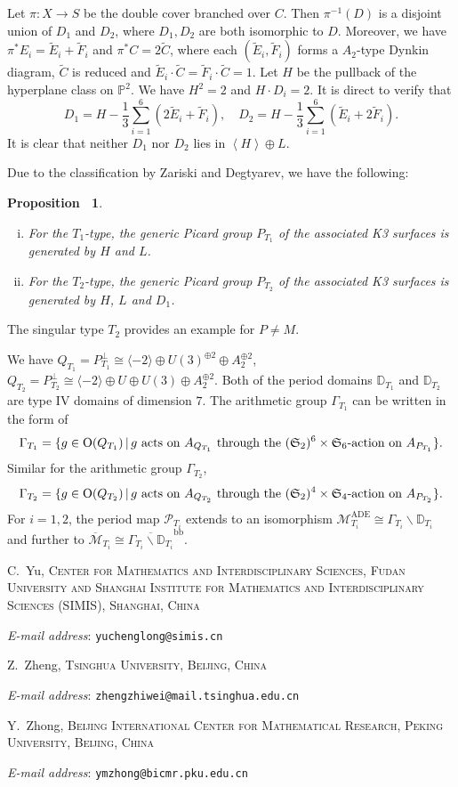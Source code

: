 \documentclass[12pt,reqno,a4paper]{amsart}
\makeatletter
\newtheorem{prop}[thm]{Proposition~}
\theoremstyle{remark}
\theoremstyle{definition}
\newcommand{\PP}{\mathbb{P}}
\newcommand{\DD}{\mathbb{D}}
\newcommand{\Prd}{\mathscr{P}}
\newcommand{\calM}{\mathcal{M}}
\newcommand\Or{\mathrm{O}}
\newcommand{\bs}{\backslash}
\newcommand{\Addresses}{{%
		\bigskip
		\footnotesize
		
		C.~Yu, \textsc{Center for Mathematics and Interdisciplinary Sciences, Fudan University and
Shanghai Institute for Mathematics and Interdisciplinary Sciences (SIMIS), Shanghai, China}\par\nopagebreak
		\textit{E-mail address}: \texttt{yuchenglong@simis.cn}
		
		\medskip
		
		Z.~Zheng, \textsc{Tsinghua University, Beijing, China}\par\nopagebreak
		\textit{E-mail address}: \texttt{zhengzhiwei@mail.tsinghua.edu.cn}

        \medskip
		
		Y.~Zhong, \textsc{Beijing International Center for Mathematical Research, Peking University, Beijing, China}\par\nopagebreak
		\textit{E-mail address}: \texttt{ymzhong@bicmr.pku.edu.cn}
}}
\makeatother
\begin{document}
Let $\pi\colon X\to S$ be the double cover branched over $C$.
Then $\pi^{-1}(D)$ is a disjoint union of $D_1$ and $D_2$, where $D_1,D_2$ are both isomorphic to $D$.
Moreover, we have $\pi^* E_i = \widetilde{E}_i + \widetilde{F}_i$ and $\pi^* C = 2 \widetilde{C}$, where each $(\widetilde{E}_i,\widetilde{F}_i)$ forms a $A_2$-type Dynkin diagram, $\widetilde{C}$ is reduced and $\widetilde{E}_i\cdot \widetilde{C} = \widetilde{F}_i\cdot \widetilde{C} = 1$.
Let $H$ be the pullback of the hyperplane class on $\PP^2$.
We have $H^2=2$ and $H\cdot D_i=2$.
It is direct to verify that 
\begin{equation*}
    D_1 = H - \frac{1}{3}\sum_{i=1}^6 (2 \widetilde{E}_i + \widetilde{F}_i),\quad D_2 = H - \frac{1}{3}\sum_{i=1}^6 (\widetilde{E}_i + 2 \widetilde{F}_i).
\end{equation*}
It is clear that neither $D_1$ nor $D_2$ lies in $\left\langle H\right\rangle \oplus L$.

Due to the classification by Zariski and Degtyarev, we have the following:
\begin{prop}
\label{proposition: picard zariski pair}
\begin{enumerate}[(i)]
    \item For the $T_1$-type, the generic Picard group $P_{T_1}$ of the associated K3 surfaces is generated by $H$ and $L$.
    \item For the $T_2$-type, the generic Picard group $P_{T_2}$ of the associated K3 surfaces is generated by $H$, $L$ and $D_1$.
\end{enumerate}
\end{prop}
The singular type $T_2$ provides an example for $P\ne M$.

We have $Q_{T_1}=P_{T_1}^\perp\cong \langle -2\rangle\oplus U(3)^{\oplus 2}\oplus A_2^{\oplus 2}$, $Q_{T_2}=P_{T_2}^\perp\cong \langle -2\rangle\oplus U\oplus U(3)\oplus A_2^{\oplus 2}$.
Both of the period domains $\DD_{T_1}$ and $\DD_{T_2}$ are type IV domains of dimension $7$.
The arithmetic group $\Gamma_{T_1}$ can be written in the form of
\begin{equation*}
    \Gamma_{T_1} = \{ g\in\Or(Q_{T_1}) \,|\, g \textup{ acts on } A_{Q_{T_1}} \textup{ through the } (\mathfrak{S}_2)^6\times\mathfrak{S}_6\textup{-action on } A_{P_{T_1}} \}.
\end{equation*}
Similar for the arithmetic group $\Gamma_{T_2}$,
\begin{equation*}
    \Gamma_{T_2} = \{ g\in\Or(Q_{T_2}) \,|\, g \textup{ acts on } A_{Q_{T_2}} \textup{ through the } (\mathfrak{S}_2)^4\times\mathfrak{S}_4\textup{-action on } A_{P_{T_2}} \}.
\end{equation*}
For $i=1,2$, the period map $\Prd_{T_i}$ extends to an isomorphism $\calM_{T_i}^{\mathrm{ADE}} \cong \Gamma_{T_i} \bs \DD_{T_i}$ and further to $\overline{\calM}_{T_i} \cong \overline{\Gamma_{T_i} \bs \DD_{T_i}}^{\mathrm{bb}}$.





\Addresses
\end{document}
